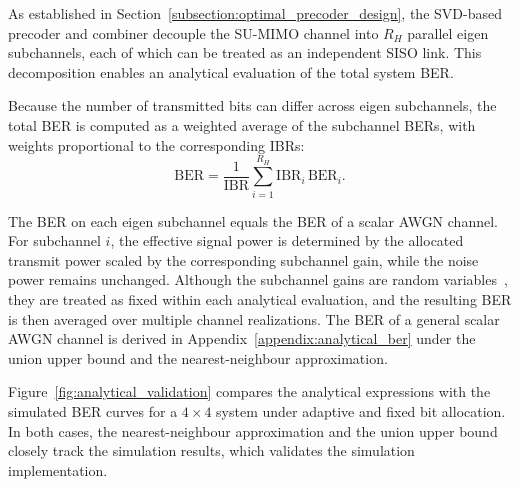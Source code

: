 As established in Section~\ref{subsection:optimal_precoder_design}, the \ac{SVD}-based precoder and combiner decouple the \ac{SU}-\ac{MIMO} channel into $R_H$ parallel eigen subchannels, each of which can be treated as an independent \ac{SISO} link.
This decomposition enables an analytical evaluation of the total system \ac{BER}.

Because the number of transmitted bits can differ across eigen subchannels, the total \ac{BER} is computed as a weighted average of the subchannel \acp{BER}, with weights proportional to the corresponding \acp{IBR}:
\begin{equation}
\label{eq:analytical_ber_su_mimo}
    \mathrm{BER} = \frac{1}{\mathrm{IBR}} \sum_{i=1}^{R_H} \mathrm{IBR}_i \, \mathrm{BER}_i.
\end{equation}

The \ac{BER} on each eigen subchannel equals the \ac{BER} of a scalar \ac{AWGN} channel.
For subchannel $i$, the effective signal power is determined by the allocated transmit power scaled by the corresponding subchannel gain, while the noise power remains unchanged.
Although the subchannel gains are random variables~\cite{singular_values_distribution}, they are treated as fixed within each analytical evaluation, and the resulting \ac{BER} is then averaged over multiple channel realizations.
The \ac{BER} of a general scalar \ac{AWGN} channel is derived in Appendix~\ref{appendix:analytical_ber} under the union upper bound and the nearest-neighbour approximation.

Figure~\ref{fig:analytical_validation} compares the analytical expressions with the simulated \ac{BER} curves for a $4 \times 4$ system under adaptive and fixed bit allocation.
In both cases, the nearest-neighbour approximation and the union upper bound closely track the simulation results, which validates the simulation implementation.

